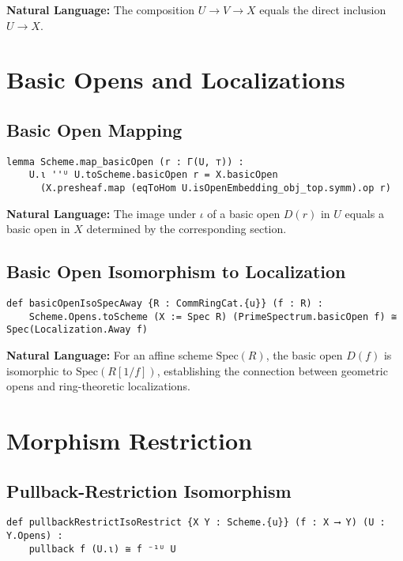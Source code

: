 \documentclass{article}
\theoremstyle{definition}
\begin{document}
\textbf{Natural Language:} The composition $U \to V \to X$ equals the direct inclusion $U \to X$.

\section{Basic Opens and Localizations}

\subsection{Basic Open Mapping}

\begin{lstlisting}
lemma Scheme.map_basicOpen (r : Γ(U, ⊤)) :
    U.ι ''ᵁ U.toScheme.basicOpen r = X.basicOpen
      (X.presheaf.map (eqToHom U.isOpenEmbedding_obj_top.symm).op r)
\end{lstlisting}

\textbf{Natural Language:} The image under $\iota$ of a basic open $D(r)$ in $U$ equals a basic open in $X$ determined by the corresponding section.

\subsection{Basic Open Isomorphism to Localization}

\begin{lstlisting}
def basicOpenIsoSpecAway {R : CommRingCat.{u}} (f : R) :
    Scheme.Opens.toScheme (X := Spec R) (PrimeSpectrum.basicOpen f) ≅ Spec(Localization.Away f)
\end{lstlisting}

\textbf{Natural Language:} For an affine scheme $\mathrm{Spec}(R)$, the basic open $D(f)$ is isomorphic to $\mathrm{Spec}(R[1/f])$, establishing the connection between geometric opens and ring-theoretic localizations.

\section{Morphism Restriction}

\subsection{Pullback-Restriction Isomorphism}

\begin{lstlisting}
def pullbackRestrictIsoRestrict {X Y : Scheme.{u}} (f : X ⟶ Y) (U : Y.Opens) :
    pullback f (U.ι) ≅ f ⁻¹ᵁ U
\end{lstlisting}
\end{document}
